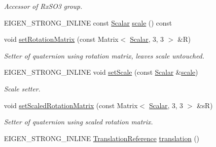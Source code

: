 \begin{DoxyCompactItemize}
\begin{DoxyCompactList}\small\item\em Accessor of Rx\+S\+O3 group. \end{DoxyCompactList}\item 
E\+I\+G\+E\+N\+\_\+\+S\+T\+R\+O\+N\+G\+\_\+\+I\+N\+L\+I\+NE const \hyperlink{class_sophus_1_1_sim3_group_base_abcf3d57b9fcc425bbc367a85a45a8092}{Scalar} \hyperlink{class_sophus_1_1_sim3_group_base_a31cf579b7bc4d3b3358921f3501700cd}{scale} () const 
\item 
void \hyperlink{class_sophus_1_1_sim3_group_base_a5af76b731517484c70bff80ea9c3357f}{set\+Rotation\+Matrix} (const Matrix$<$ \hyperlink{class_sophus_1_1_sim3_group_base_abcf3d57b9fcc425bbc367a85a45a8092}{Scalar}, 3, 3 $>$ \&R)
\begin{DoxyCompactList}\small\item\em Setter of quaternion using rotation matrix, leaves scale untouched. \end{DoxyCompactList}\item 
E\+I\+G\+E\+N\+\_\+\+S\+T\+R\+O\+N\+G\+\_\+\+I\+N\+L\+I\+NE void \hyperlink{class_sophus_1_1_sim3_group_base_a04b97a30687ff11cd2c1192902b495e0}{set\+Scale} (const \hyperlink{class_sophus_1_1_sim3_group_base_abcf3d57b9fcc425bbc367a85a45a8092}{Scalar} \&\hyperlink{class_sophus_1_1_sim3_group_base_a31cf579b7bc4d3b3358921f3501700cd}{scale})\hypertarget{class_sophus_1_1_sim3_group_base_a04b97a30687ff11cd2c1192902b495e0}{}\label{class_sophus_1_1_sim3_group_base_a04b97a30687ff11cd2c1192902b495e0}

\begin{DoxyCompactList}\small\item\em Scale setter. \end{DoxyCompactList}\item 
void \hyperlink{class_sophus_1_1_sim3_group_base_ad5f6f6386cae4ad0af6c13825a4eca78}{set\+Scaled\+Rotation\+Matrix} (const Matrix$<$ \hyperlink{class_sophus_1_1_sim3_group_base_abcf3d57b9fcc425bbc367a85a45a8092}{Scalar}, 3, 3 $>$ \&sR)
\begin{DoxyCompactList}\small\item\em Setter of quaternion using scaled rotation matrix. \end{DoxyCompactList}\item 
E\+I\+G\+E\+N\+\_\+\+S\+T\+R\+O\+N\+G\+\_\+\+I\+N\+L\+I\+NE \hyperlink{class_sophus_1_1_sim3_group_base_a0491010ffcd9971dea880f7bce6910e5}{Translation\+Reference} \hyperlink{class_sophus_1_1_sim3_group_base_ae0a27d16e3c355fcf6977f1875f82ba6}{translation} ()\hypertarget{class_sophus_1_1_sim3_group_base_ae0a27d16e3c355fcf6977f1875f82ba6}{}\label{class_sophus_1_1_sim3_group_base_ae0a27d16e3c355fcf6977f1875f82ba6}


\end{DoxyCompactItemize}
